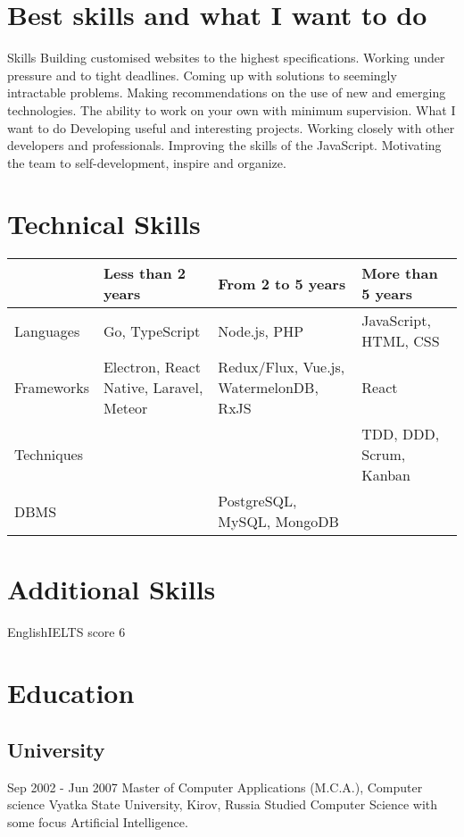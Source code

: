 \documentclass[11pt,a4paper]{moderncv}
\begin{document}
\maketitle
\section{Best skills and what I want to do}
  \cvline
    {Skills}{
      Building customised websites to the highest specifications.
      Working under pressure and to tight deadlines.
      Coming up with solutions to seemingly intractable problems.
      Making recommendations on the use of new and emerging technologies.
      The ability to work on your own with minimum supervision.}
  \cvline
    {What I want to do}{
      Developing useful and interesting projects.
      Working closely with other developers and professionals.
      Improving the skills of the JavaScript.
      Motivating the team to self-development, inspire and organize.}

\section{Technical Skills}

\begin{tabular}{ l||m{4cm}|m{4cm}|m{4cm}|  }
  & Less than 2 years & From 2 to 5 years & More than 5 years \\
  \hline\hline
  Languages & Go, TypeScript & Node.js, PHP & JavaScript, HTML, CSS \\
  \hline
  Frameworks & Electron, React Native, Laravel, Meteor & Redux/Flux, Vue.js, WatermelonDB, RxJS & React \\
  \hline
  Techniques & & & TDD, DDD, Scrum, Kanban \\
  \hline
  DBMS & & PostgreSQL, MySQL, MongoDB & \\
  \hline
\end{tabular}

\section{Additional Skills}
  \cvline
    {English}{IELTS score 6}

\section{Education}
  \subsection{University}
  \cventry
    {Sep 2002 - Jun 2007}
    {Master of Computer Applications (M.C.A.), Computer science}
    {\newline Vyatka State University, Kirov, Russia}
    {}{}
    {Studied Computer Science with some focus Artificial Intelligence.}
\end{document}
